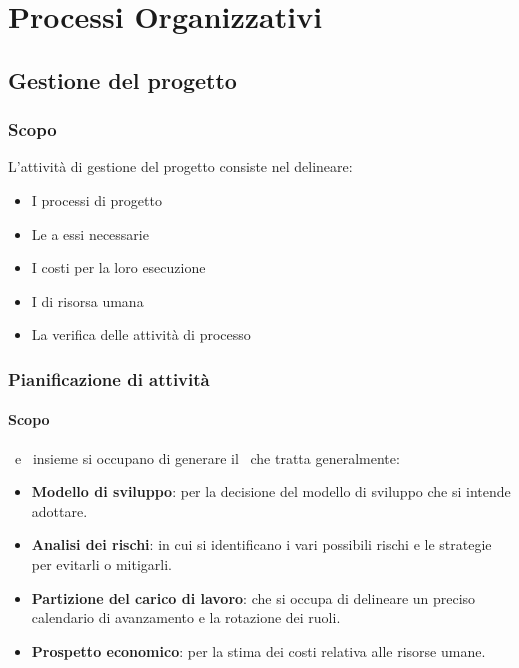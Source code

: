 \section{Processi Organizzativi}

    \subsection{Gestione del progetto}

	    \subsubsection{Scopo}
	    L'attività di gestione del progetto consiste nel delineare:
	    \begin{itemize}
	    	\item I processi di progetto
	    	\item Le  a essi necessarie
	    	\item I costi per la loro esecuzione
	    	\item I  di risorsa umana
	    	\item La verifica delle attività di processo
	    \end{itemize}

		
		\subsubsection{Pianificazione di attività}

			\paragraph{Scopo}
			\Res\ e \Amm\ insieme si occupano di generare il \PdP\ che tratta generalmente:
			\begin{itemize}
				\item \textbf{Modello di sviluppo}: per la decisione del modello di sviluppo che si intende adottare.
				\item \textbf{Analisi dei rischi}: in cui si identificano i vari possibili rischi e le strategie per evitarli o mitigarli.
				\item \textbf{Partizione del carico di lavoro}: che si occupa di delineare un preciso calendario di avanzamento e la rotazione dei ruoli.
				\item \textbf{Prospetto economico}: per la stima dei costi relativa alle risorse umane.
			\end{itemize}

